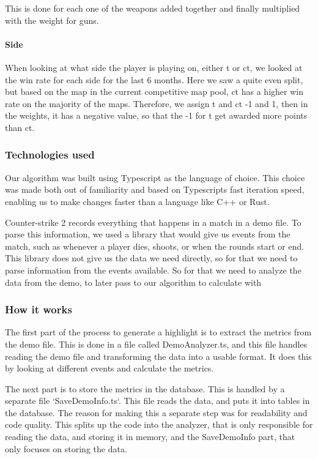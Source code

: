 This is done for each one of the weapons added together and finally multiplied with the weight for guns.


\paragraph{Side}
When looking at what side the player is playing on, either \acrshort{t} or \acrshort{ct}, we looked at the win rate for each side for the last 6 months\cite{hltvMapStats}. Here we saw a quite even split, but based on the map in the current competitive map pool, \acrshort{ct} has a higher win rate on the majority of the maps. Therefore, we assign \acrshort{t} and \acrshort{ct} -1 and 1, then in the weights, it has a negative value, so that the -1 for \acrshort{t} get awarded more points than \acrshort{ct}.


\subsubsection{Technologies used}
Our algorithm was built using Typescript as the language of choice. This choice was made both out of familiarity and based on Typescripts fast iteration speed, enabling us to make changes faster than a language like C++ or Rust.

Counter-strike 2 records everything that happens in a match in a \Gls{demo} file. To parse this information, we used a library\cite{demoparser} that would give us events from the match, such as whenever a player dies, shoots, or when the rounds start or end. This library does not give us the data we need directly, so for that we need to parse information from the events available. So for that we need to analyze the data from the demo, to later pass to our algorithm to calculate with 
\subsubsection{How it works}
The first part of the process to generate a highlight is to extract the metrics from the demo file. This is done in a file called DemoAnalyzer.ts, and this file handles reading the \Gls{demo} file and transforming the data into a usable format. It does this by looking at different events  and calculate the metrics. 

The next part is to store the metrics in the database. This is handled by a separate file `SaveDemoInfo.ts`. This file reads the data, and puts it into tables in the database. The reason for making this a separate step was for readability and code quality. This splits up the code into the analyzer, that is only responsible for reading the data, and storing it in memory, and the SaveDemoInfo part, that only focuses on storing the data. 

